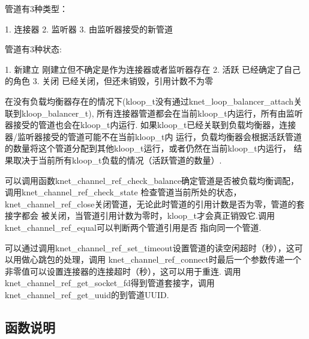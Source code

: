 \begin{DoxyPre}管道有3种类型：\end{DoxyPre}



\begin{DoxyPre}1. 连接器
2. 监听器
3. 由监听器接受的新管道\end{DoxyPre}



\begin{DoxyPre}管道有3种状态:\end{DoxyPre}



\begin{DoxyPre}1. 新建立 刚建立但不确定是作为连接器或者监听器存在
2. 活跃   已经确定了自己的角色
3. 关闭   已经关闭，但还未销毁，引用计数不为零\end{DoxyPre}



\begin{DoxyPre}在没有负载均衡器存在的情况下(kloop\_t没有通过knet\_loop\_balancer\_attach关联到kloop\_balancer\_t),
所有连接器管道都会在当前kloop\_t内运行，所有由监听器接受的管道也会在kloop\_t内运行.
如果kloop\_t已经关联到负载均衡器，连接器/监听器接受的管道可能不在当前kloop\_t内
运行，负载均衡器会根据活跃管道的数量将这个管道分配到其他kloop\_t运行，或者仍然在当前kloop\_t内运行，
结果取决于当前所有kloop\_t负载的情况（活跃管道的数量）.\end{DoxyPre}



\begin{DoxyPre}可以调用函数knet\_channel\_ref\_check\_balance确定管道是否被负载均衡调配，调用knet\_channel\_ref\_check\_state
检查管道当前所处的状态，knet\_channel\_ref\_close关闭管道，无论此时管道的引用计数是否为零，管道的套接字都会
被关闭，当管道引用计数为零时，kloop\_t才会真正销毁它.调用knet\_channel\_ref\_equal可以判断两个管道引用是否
指向同一个管道.\end{DoxyPre}



\begin{DoxyPre}可以通过调用knet\_channel\_ref\_set\_timeout设置管道的读空闲超时（秒），这可以用做心跳包的处理，调用
knet\_channel\_ref\_connect时最后一个参数传递一个非零值可以设置连接器的连接超时（秒），这可以用于重连.
调用knet\_channel\_ref\_get\_socket\_fd得到管道套接字，调用knet\_channel\_ref\_get\_uuid的到管道UUID.
\end{DoxyPre}
 

\subsection{函数说明}
\hypertarget{a00113_ga92a683023f347ae7c4eb692180884a01_ga92a683023f347ae7c4eb692180884a01}{}
